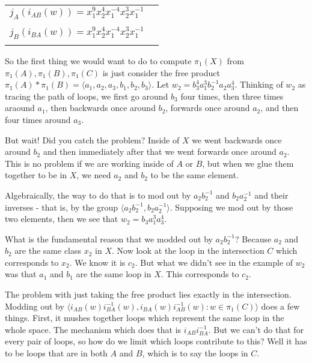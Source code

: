 \documentclass[11pt]{amsart}
\begin{document}
\begin{center}
	\begin{tabular}{l l} \\
		$j_A(i_{AB}(w)) = x_1^9x_2^4x_1^{-4}x_2^3x_1^{-1} $\\
		\\
		$j_B(i_{BA}(w)) = x_1^9x_2^4x_1^{-4}x_2^3x_1^{-1} $\\ \\
	\end{tabular}
\end{center}

So the first thing we would want to do to compute $\pi_1(X)$ from $\pi_1(A), \pi_1(B), \pi_1(C)$ is just consider the free product $\pi_1(A) * \pi_1(B) = \langle a_1,a_2,a_3, b_1, b_2, b_3 \rangle$. Let $w_2 = b_3^4a_1^3b_2^{-1}a_2a_3^4$.
%
Thinking of $w_2$ as tracing the path of loops, we first go around $b_3$ four times, then three times araound $a_1$, then backwards once around $b_2$, forwards once around $a_2$, and then four times around $a_3$.


But wait! Did you catch the problem? Inside of $X$ we went backwards once around $b_2$ and then immediately after that we went forwards once around $a_2$. This is no problem if we are working inside of $A$ or $B$, but when we glue them together to be in $X$, we need $a_2$ and $b_2$ to be the same element. 

Algebraically, the way to do that is to mod out by $a_2b_2^{-1}$ and $b_2a_2^{-1}$ and their inverses - that is, by the group $\langle a_2b_2^{-1}, b_2a_2^{-1} \rangle$.
Supposing we mod out by those two elements, then we see that 
$w_2 = b_3a_1^3 a_3^4$. 

What is the fundamental reason that we modded out by $a_2 b_2^{-1}$? Because $a_2$ and $b_2$ are the same class $x_2$ in $X$. 
Now look at the loop in the intersection $C$ which corresponds to $x_2$. We know it is $c_2$. But what we didn't see in the example of $w_2$ was that $a_1$ and $b_1$ are the same loop in $X$. This corresponds to $c_2$. 

The problem with just taking the free product lies exactly in the intersection. Modding out by $\langle i_{AB}(w) i_{BA}^{-1} (w), i_{BA}(w) i_{AB}^{-1}(w) : w \in \pi_1(C) \rangle$ does a few things. First, it mushes together loops which represent the same loop in the whole space. The mechanism which does that is $i_{AB} i_{BA}^{-1}$. But we can't do that for every pair of loops, so how do we limit which loops contribute to this? Well it has to be loops that are in both $A$ and $B$, which is to say the loops in $C$.
\end{document}
